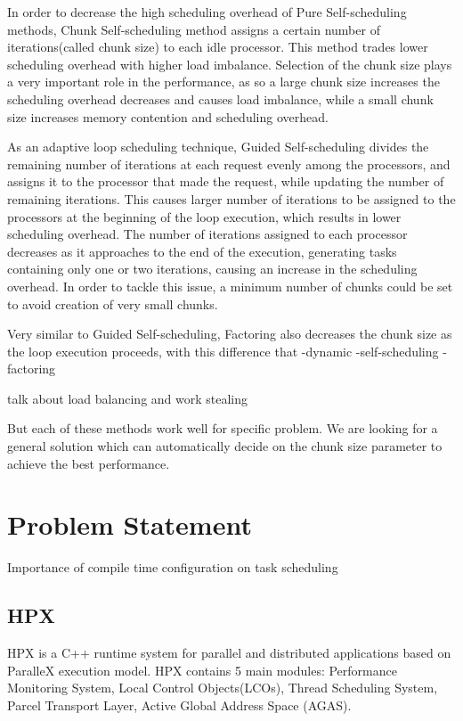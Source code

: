 In order to decrease the high scheduling overhead of Pure Self-scheduling methods, Chunk Self-scheduling method assigns a certain number of iterations(called chunk size) to each idle processor. This method trades lower scheduling overhead with higher load imbalance. Selection of the chunk size plays a very important role in the performance, as so a large chunk size increases the scheduling overhead decreases and causes load imbalance, while a small chunk size increases memory contention and scheduling overhead\cite{liu1994safe}. 

As an adaptive loop scheduling technique, Guided Self-scheduling\cite{polychronopoulos1987guided} divides the remaining number of iterations at each request evenly among the processors, and assigns it to the processor that made the request, while updating the number of remaining iterations. This causes larger number of iterations to be assigned to the processors at the beginning of the loop execution, which results in lower scheduling overhead. The number of iterations assigned to each processor decreases as it approaches to the end of the execution, generating tasks containing only one or two iterations, causing an increase in the scheduling overhead. In order to tackle this issue, a minimum number of chunks could be set to avoid creation of very small chunks\cite{lilja1994exploiting}. 

Very similar to Guided Self-scheduling, Factoring also decreases the chunk size as the loop execution proceeds, with this difference that   
-dynamic
-self-scheduling
-factoring

talk about load balancing and work stealing


But each of these methods work well for specific problem. We are looking for a general solution which can automatically decide on the chunk size parameter to achieve the best performance.


\section{Problem Statement}
Importance of compile time configuration on task scheduling

\subsection{HPX}
HPX\cite{kaiser2014hpx} is a C++ runtime system for parallel and distributed applications based on ParalleX execution model\cite{kaiser2009parallex}. 
HPX contains 5 main modules: Performance Monitoring System, Local Control Objects(LCOs), Thread Scheduling System, Parcel Transport Layer, Active Global Address Space (AGAS).


